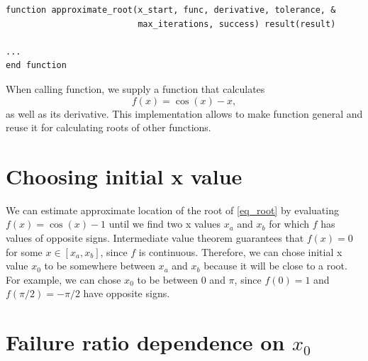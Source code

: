 \noindent\begin{minipage}{\linewidth}
\begin{lstlisting}[caption={Definition of a function for approximating a root of equation that is passed as input parameter (\code{newton\_raphson.f90}).},frame=tlrb,label={code_approximate_root}]
function approximate_root(x_start, func, derivative, tolerance, &
                          max_iterations, success) result(result)

...
end function
\end{lstlisting}
\end{minipage}

When calling  function, we supply a function that calculates
\[
  f(x) = \cos(x) - x,
\]
as well as its derivative. This implementation allows to make  function general and reuse it for calculating roots of other functions.


\section{Choosing initial x value}

We can estimate approximate location of the root of \autoref{eq_root} by evaluating $f(x) = \cos(x) - 1$ until we find two x values $x_a$ and $x_b$ for which $f$ has values of opposite signs. Intermediate value theorem guarantees that $f(x)=0$ for some $x \in [x_a, x_b]$, since $f$ is continuous. Therefore, we can chose initial x value $x_0$ to be somewhere between $x_a$ and $x_b$ because it will be close to a root. For example, we can chose $x_0$ to be between $0$ and $\pi$, since $f(0)=1$ and $f(\pi/2) = -\pi/2$ have opposite signs.


\section{Failure ratio dependence on $x_0$}

